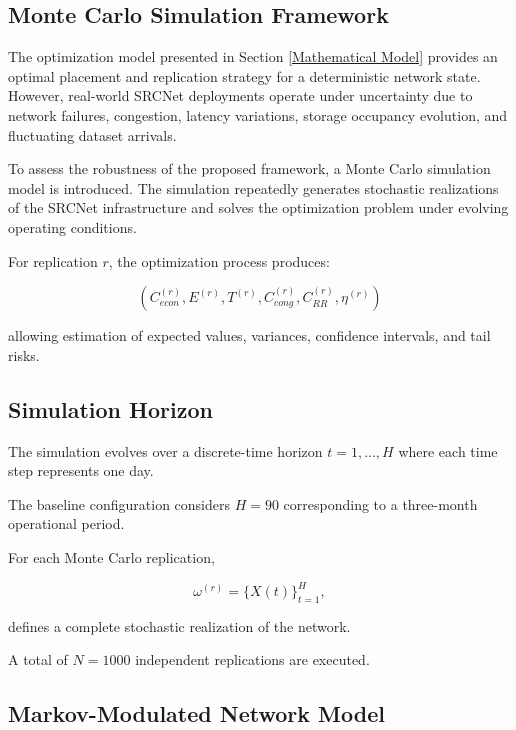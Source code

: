 \documentclass[a4paper,fleqn]{cas-dc}
\begin{document}


\subsection{Monte Carlo Simulation Framework}

The optimization model presented in Section \ref{Mathematical Model} provides an optimal placement and replication strategy for a deterministic network state. However, real-world SRCNet deployments operate under uncertainty due to network failures, congestion, latency variations, storage occupancy evolution, and fluctuating dataset arrivals.

To assess the robustness of the proposed framework, a Monte Carlo simulation model is introduced. The simulation repeatedly generates stochastic realizations of the SRCNet infrastructure and solves the optimization problem under evolving operating conditions.

For replication $r$, the optimization process produces:

\begin{equation}
\nonumber \left(
C_{econ}^{(r)},
E^{(r)},
T^{(r)},
C_{cong}^{(r)},
C_{RR}^{(r)},
\eta^{(r)}
\right)
\end{equation}

allowing estimation of expected values, variances, confidence intervals, and tail risks.

\subsection*{Simulation Horizon}

The simulation evolves over a discrete-time horizon $t=1,\ldots,H$ where each time step represents one day.

The baseline configuration considers $H=90$ corresponding to a three-month operational period.

For each Monte Carlo replication,

\begin{equation}
\omega^{(r)}
=
\{X(t)\}_{t=1}^{H},
\end{equation}

defines a complete stochastic realization of the network.

A total of $N = 1000$ independent replications are executed.

\subsection*{Markov-Modulated Network Model}
\end{document}
